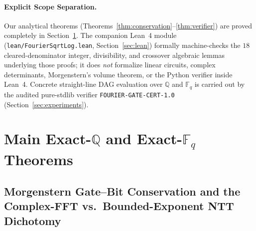 \documentclass[11pt,a4paper]{article}
\theoremstyle{definition}
\theoremstyle{remark}
\newcommand{\QQ}{\mathbb{Q}}
\newcommand{\FF}{\mathbb{F}}
\newcommand{\certschema}{\texttt{FOURIER-GATE-CERT-1.0}}
\begin{document}
\paragraph{Explicit Scope Separation.}
Our analytical theorems (Theorems~\ref{thm:conservation}--\ref{thm:verifier}) are proved completely in Section~\ref{sec:results}. The companion Lean~4 module (\texttt{lean/FourierSqrtLog.lean}, Section~\ref{sec:lean}) formally machine-checks the $18$ cleared-denominator integer, divisibility, and crossover algebraic lemmas underlying those proofs; it does \emph{not} formalize linear circuits, complex determinants, Morgenstern's volume theorem, or the Python verifier inside Lean~4. Concrete straight-line DAG evaluation over $\QQ$ and $\FF_q$ is carried out by the audited pure-stdlib verifier \certschema{} (Section~\ref{sec:experiments}).

\section{Main Exact-\texorpdfstring{$\QQ$}{Q} and Exact-\texorpdfstring{$\FF_q$}{Fq} Theorems}\label{sec:results}

\subsection{Morgenstern Gate--Bit Conservation and the Complex-FFT vs.\ Bounded-Exponent NTT Dichotomy}
\end{document}
